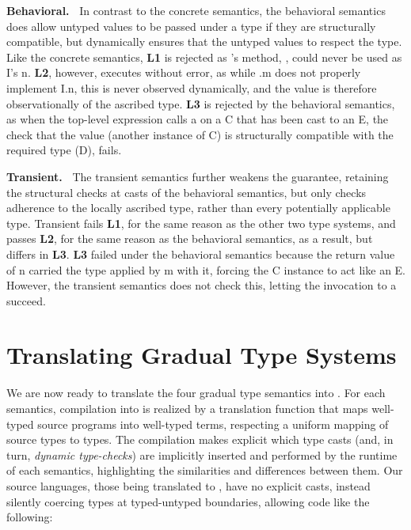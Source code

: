 \documentclass[runnningheads]{tex/llncs}
\begin{document}
{\bf Behavioral.~} In contrast to the concrete semantics, the behavioral
semantics does allow untyped values to be passed under a type if they are
structurally compatible, but dynamically ensures that the untyped values to
respect the type. Like the concrete semantics, {\bf L1} is rejected as \A's
method, \m, could never be used as \xt I's \xt n. {\bf L2}, however,
executes without error, as while \A.\xt m does not properly implement \xt
I.\xt n, this is never observed dynamically, and the value is therefore
observationally of the ascribed type. {\bf L3} is rejected by the behavioral
semantics, as when the top-level expression calls \xt a on a \xt C that has
been cast to an \xt E, the check that the value (another instance of \xt C)
is structurally compatible with the required type (\xt D), fails.

{\bf Transient.~} The transient semantics further weakens the guarantee,
retaining the structural checks at casts of the behavioral semantics, but
only checks adherence to the locally ascribed type, rather than every
potentially applicable type. Transient fails {\bf L1}, for the same reason
as the other two type systems, and passes {\bf L2}, for the same reason as
the behavioral semantics, as a result, but differs in {\bf L3}. {\bf L3}
failed under the behavioral semantics because the return value of \xt n
carried the type applied by \xt m with it, forcing the \xt C instance to act
like an \xt E.  However, the transient semantics does not check this,
letting the invocation to \xt a succeed.


\section{Translating Gradual Type Systems}


\noindent
We are now ready to translate the four gradual type semantics into \kafka.
For each semantics, compilation into \kafka is realized by a translation
function that maps well-typed source programs into well-typed \kafka terms,
respecting a uniform mapping of source types to \kafka types.  The
compilation makes explicit which type casts (and, in turn, \emph{dynamic
  type-checks}) are implicitly inserted and performed by the runtime of each
semantics, highlighting the similarities and differences between them.  Our
source languages, those being translated to \kafka, have no explicit casts,
instead silently coercing types at typed-untyped boundaries, allowing code
like the following:
\end{document}
